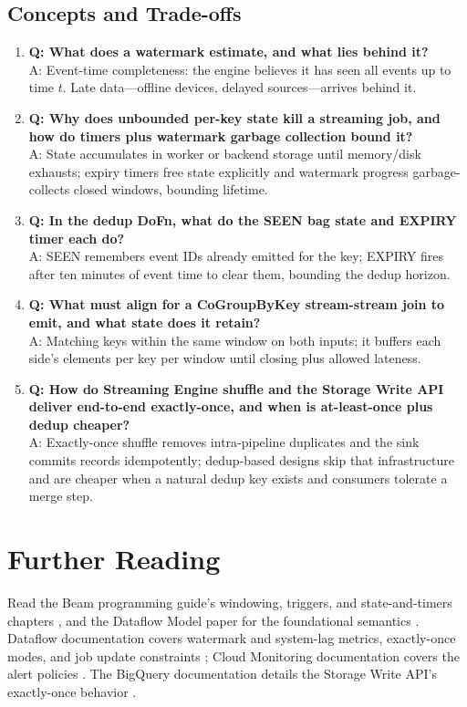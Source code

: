 \subsection{Concepts and Trade-offs}
\begin{enumerate}
    \item \textbf{Q: What does a watermark estimate, and what lies behind it?}\\
    A: Event-time completeness: the engine believes it has seen all events up to time $t$. Late data---offline devices, delayed sources---arrives behind it.

    \item \textbf{Q: Why does unbounded per-key state kill a streaming job, and how do timers plus watermark garbage collection bound it?}\\
    A: State accumulates in worker or backend storage until memory/disk exhausts; expiry timers free state explicitly and watermark progress garbage-collects closed windows, bounding lifetime.

    \item \textbf{Q: In the dedup DoFn, what do the SEEN bag state and EXPIRY timer each do?}\\
    A: SEEN remembers event IDs already emitted for the key; EXPIRY fires after ten minutes of event time to clear them, bounding the dedup horizon.

    \item \textbf{Q: What must align for a CoGroupByKey stream-stream join to emit, and what state does it retain?}\\
    A: Matching keys within the same window on both inputs; it buffers each side's elements per key per window until closing plus allowed lateness.

    \item \textbf{Q: How do Streaming Engine shuffle and the Storage Write API deliver end-to-end exactly-once, and when is at-least-once plus dedup cheaper?}\\
    A: Exactly-once shuffle removes intra-pipeline duplicates and the sink commits records idempotently; dedup-based designs skip that infrastructure and are cheaper when a natural dedup key exists and consumers tolerate a merge step.
\end{enumerate}

\section{Further Reading}
Read the Beam programming guide's windowing, triggers, and state-and-timers chapters \cite{apachebeamdocs}, and the Dataflow Model paper for the foundational semantics \cite{akidau2015dataflow}. Dataflow documentation covers watermark and system-lag metrics, exactly-once modes, and job update constraints \cite{googleclouddataflowdocs}; Cloud Monitoring documentation covers the alert policies \cite{googlecloudmonitoringdocs}. The BigQuery documentation details the Storage Write API's exactly-once behavior \cite{googlecloudbigquerydocs}.

